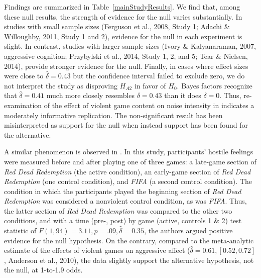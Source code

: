 \documentclass[man]{apa6}
\begin{document}
Findings are summarized in Table~\ref{mainStudyResults}. We find that, among these null results, the strength of evidence for the null varies substantially. In studies with small sample sizes (Ferguson et al., 2008, Study 1; Adachi \& Willoughby, 2011, Study 1 and 2), evidence for the null in each experiment is slight. 
In contrast, studies with larger sample sizes (Ivory \& Kalyanaraman, 2007, aggressive cognition; Przybylski et al., 2014, Study 1, 2, and 5; Tear \& Nielsen, 2014), \nocite{Ivory:Kalyanaraman:2007,Przybylski:etal:2014,Tear:Nielsen:2014} provide stronger evidence for the null.	Finally, in cases where effect sizes were close to $\hat{\delta} = 0.43$ but the confidence interval failed to exclude zero, we do not interpret the study as disproving $H_{A2}$ in favor of $H_0$. Bayes factors recognize that $\hat{\delta} = 0.41$ much more closely resembles $\delta = 0.43$ than it does $\delta = 0$. Thus, re-examination of the effect of violent game content on noise intensity in \citet{Elson:etal:2013} indicates a moderately informative replication. The non-significant result has been misinterpreted as support for the null when instead support has been found for the alternative.  

A similar phenomenon is observed in \citet{Valadez:Ferguson:2012}. In this study, participants' hostile feelings were measured before and after playing one of three games: a late-game section of {\em Red Dead Redemption} (the active condition), an early-game section of {\em Red Dead Redemption} (one control condition), and {\em FIFA} (a second control condition). The condition in which the participants played the beginning section of {\em Red Dead Redemption} was considered a nonviolent control condition, as was {\em FIFA}. Thus, the latter section of {\em Red Dead Redemption} was compared to the other two conditions, and with a time (pre-, post) by game (active, controls 1 \& 2) test statistic of $F(1, 94) = 3.11, p = .09, \hat{\delta} = 0.35$, the authors argued positive evidence for the null hypothesis. On the contrary, compared to the meta-analytic estimate of the effects of violent games on aggressive affect ($\hat{\delta} = 0.61, [0.52, 0.72]$, Anderson et al., 2010), the data slightly support the alternative hypothesis, not the null, at 1-to-1.9 odds. 
\end{document}
